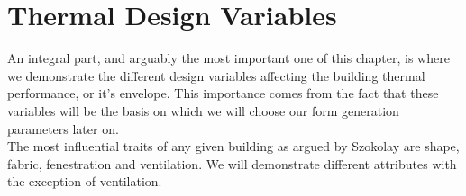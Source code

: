 \section{Thermal Design Variables}
An integral part, and arguably the most important one of this chapter, is where we demonstrate the different design variables affecting the building thermal performance, or it's envelope. This importance comes from the fact that these variables will be the basis on which we will choose our form generation parameters later on.\\ The most influential traits of any given building as argued by Szokolay \cite{szokolay08} are shape, fabric, fenestration and ventilation. We will demonstrate different attributes with the exception of ventilation.\\ \vspace{0.5cm} \label{ThermDesVar}
